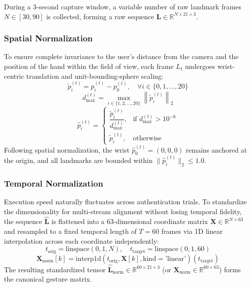 \documentclass[conference]{IEEEtran}
\begin{document}
During a 3-second capture window, a variable number of raw landmark frames $N \in [30, 90]$ is collected, forming a raw sequence $\mathbf{L} \in \mathbb{R}^{N \times 21 \times 3}$.

\subsubsection{Spatial Normalization}
To ensure complete invariance to the user's distance from the camera and the position of the hand within the field of view, each frame $L_t$ undergoes wrist-centric translation and unit-bounding-sphere scaling:
\begin{equation}
\tilde{p}_i^{(t)} = p_i^{(t)} - p_0^{(t)}, \quad \forall i \in \{0, 1, \ldots, 20\}
\end{equation}
\begin{equation}
d_{\max}^{(t)} = \max_{i \in \{1, 2, \ldots, 20\}} \left\| \tilde{p}_i^{(t)} \right\|_2
\end{equation}
\begin{equation}
\hat{p}_i^{(t)} = \begin{cases}
\dfrac{\tilde{p}_i^{(t)}}{d_{\max}^{(t)}}, & \text{if } d_{\max}^{(t)} > 10^{-6} \\
\tilde{p}_i^{(t)}, & \text{otherwise}
\end{cases}
\label{eq:spatial_norm}
\end{equation}
Following spatial normalization, the wrist $\hat{p}_0^{(t)} = (0, 0, 0)$ remains anchored at the origin, and all landmarks are bounded within $\|\hat{p}_i^{(t)}\|_2 \le 1.0$.

\subsubsection{Temporal Normalization}
Execution speed naturally fluctuates across authentication trials. To standardize the dimensionality for multi-stream alignment without losing temporal fidelity, the sequence $\hat{\mathbf{L}}$ is flattened into a 63-dimensional coordinate matrix $\mathbf{X} \in \mathbb{R}^{N \times 63}$ and resampled to a fixed temporal length of $T = 60$ frames via 1D linear interpolation across each coordinate independently:
\begin{equation}
t_{\text{orig}} = \text{linspace}(0, 1, N), \quad t_{\text{target}} = \text{linspace}(0, 1, 60)
\end{equation}
\begin{equation}
\mathbf{X}_{\text{norm}}[k] = \text{interp1d}(t_{\text{orig}}, \mathbf{X}[k], \text{kind}=\text{'linear'})(t_{\text{target}})
\label{eq:temporal_norm}
\end{equation}
The resulting standardized tensor $\hat{\mathbf{L}}_{\text{norm}} \in \mathbb{R}^{60 \times 21 \times 3}$ (or $\mathbf{X}_{\text{norm}} \in \mathbb{R}^{60 \times 63}$) forms the canonical gesture matrix.
\end{document}
